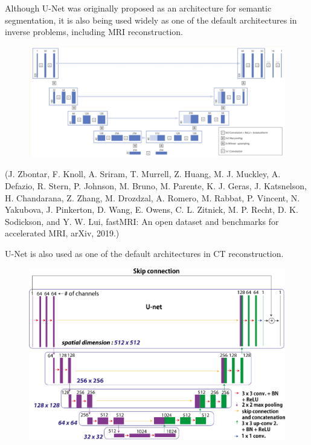 \begin{concept}
    Although U-Net was originally proposed as an architecture for semantic segmentation, it is also being used widely as one of the default architectures in inverse problems, including MRI reconstruction.

    \begin{figure}[H]
        \centering
        \includegraphics[width=1.0\textwidth]{.././assets/8.27.jpg}
    \end{figure}

    (J. Zbontar, F. Knoll, A. Sriram, T. Murrell, Z. Huang, M. J. Muckley, A. Defazio, R. Stern, P. Johnson, M. Bruno, M. Parente, K. J. Geras, J. Katsnelson, H. Chandarana, Z. Zhang, M. Drozdzal, A. Romero, M. Rabbat, P. Vincent, N. Yakubova, J. Pinkerton, D. Wang, E. Owens, C. L. Zitnick, M. P. Recht, D. K. Sodickson, and Y. W. Lui, fastMRI: An open dataset and benchmarks for accelerated MRI, arXiv, 2019.)

    \par\noindent\textcolor{gray}{\hdashrule{\textwidth}{0.4pt}{1pt 2pt}}

    U-Net is also used as one of the default architectures in CT reconstruction.

    \begin{figure}[H]
        \centering
        \includegraphics[width=1.0\textwidth]{.././assets/8.28.png}
    \end{figure}


\end{concept}
